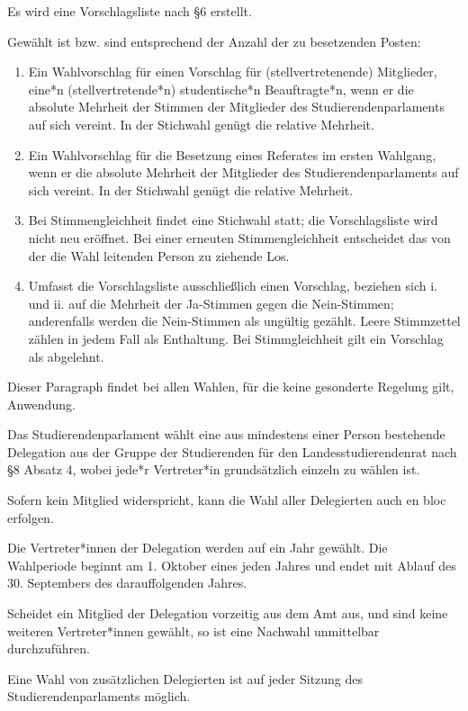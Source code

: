 \documentclass[10pt,a4paper]{scrartcl}
\begin{document}
\begin{contract}
Es wird eine Vorschlagsliste nach §6
erstellt.

Gewählt ist bzw. sind entsprechend der Anzahl der zu
besetzenden Posten: 
\begin{enumerate}
\item Ein Wahlvorschlag für einen Vorschlag für
(stellvertretenende) Mitglieder, eine*n (stellvertretende*n)
studentische*n Beauftragte*n, wenn er die absolute Mehrheit der Stimmen
der Mitglieder des Studierendenparlaments auf sich vereint. In der
Stichwahl genügt die relative Mehrheit. 
\item Ein Wahlvorschlag für die
Besetzung eines Referates im ersten Wahlgang, wenn er die absolute
Mehrheit der Mitglieder des Studierendenparlaments auf sich vereint. In
der Stichwahl genügt die relative Mehrheit.
\item Bei Stimmengleichheit
findet eine Stichwahl statt; die Vorschlagsliste wird nicht neu
eröffnet. Bei einer erneuten Stimmengleichheit entscheidet das von der
die Wahl leitenden Person zu ziehende Los.
\item Umfasst die
Vorschlagsliste ausschließlich einen Vorschlag, beziehen sich i. und ii.
auf die Mehrheit der Ja-Stimmen gegen die Nein-Stimmen; anderenfalls
werden die Nein-Stimmen als ungültig gezählt. Leere Stimmzettel zählen
in jedem Fall als Enthaltung. Bei Stimmgleichheit gilt ein Vorschlag als
abgelehnt.
\end{enumerate}

Dieser Paragraph findet bei allen Wahlen, für die keine
gesonderte Regelung gilt, Anwendung.


Das Studierendenparlament wählt eine aus mindestens einer Person bestehende
Delegation aus der Gruppe der Studierenden für den Landesstudierendenrat nach §8
Absatz 4, wobei jede*r Vertreter*in grundsätzlich einzeln zu wählen ist.

Sofern kein Mitglied widerspricht, kann die Wahl aller Delegierten
auch en bloc erfolgen.

Die Vertreter*innen der Delegation werden auf ein Jahr gewählt. Die
Wahlperiode beginnt am 1. Oktober eines jeden Jahres und endet mit Ablauf des
30. Septembers des darauffolgenden Jahres.

Scheidet ein Mitglied der Delegation vorzeitig aus dem Amt aus, und sind
keine weiteren Vertreter*innen gewählt, so ist eine Nachwahl unmittelbar
durchzuführen.

Eine Wahl von zusätzlichen Delegierten ist auf jeder Sitzung des
Studierendenparlaments möglich.


\end{contract}
\end{document}
